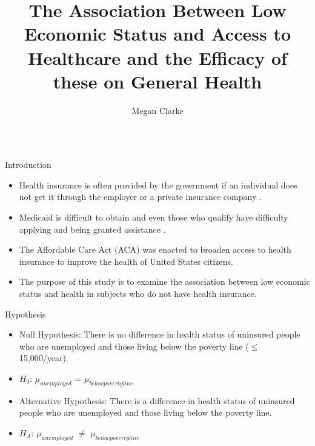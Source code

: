 \documentclass[final]{beamer}\usepackage[]{graphicx}\usepackage[]{color}
\title{The Association Between Low Economic Status and Access to Healthcare and the Efficacy of these on General Health}
\author{Megan Clarke}
\institute{Department of Mathematical Sciences}
\begin{document}
\begin{frame}[fragile]
\vspace{-2ex}
\begin{columns}[t]



\begin{column}{0.31\linewidth}
\begin{minipage}[t][.955\textheight]{\linewidth} 
\begin{block}{Introduction}
\begin{itemize}
\item Health insurance is often provided by the government if an individual does not get it through the employer or a private insurance company \cite{sommers_bd_changes_2015}.  
\item Medicaid is difficult to obtain and even those who qualify have difficulty applying and being granted assistance \cite{gaskin_economic_2012}. 
\item The Affordable Care Act (ACA) was enacted to broaden access to health insurance to improve the health of United States citizens.  
\item The purpose of this study is to examine the association between low economic status and health in subjects who do not have health insurance. 
\end{itemize}
\vspace{0ex}
\end{block}
\vfill

\begin{block}{Hypothesis}
\begin{itemize}
\item Null Hypothesis: There is no difference in health status of uninsured people who are unemployed and those living below the poverty line ($\leq$ 15,000/year).
\item $H_{0}$: $\mu_{unemployed}$ = $\mu_{belowpovertyline}$
\vspace{2ex}
\item Alternative Hypothesis: There is a difference in health status of uninsured people who are unemployed and those living below the poverty line.
\item $H_{A}$: $\mu_{unemployed}$ $\ne$ $\mu_{belowpovertyline}$
\end{itemize}
\vspace{0ex}
\vfill
\end{block}
\vfill


\end{minipage}
\end{column}
\end{columns}
\end{frame}
\end{document}
